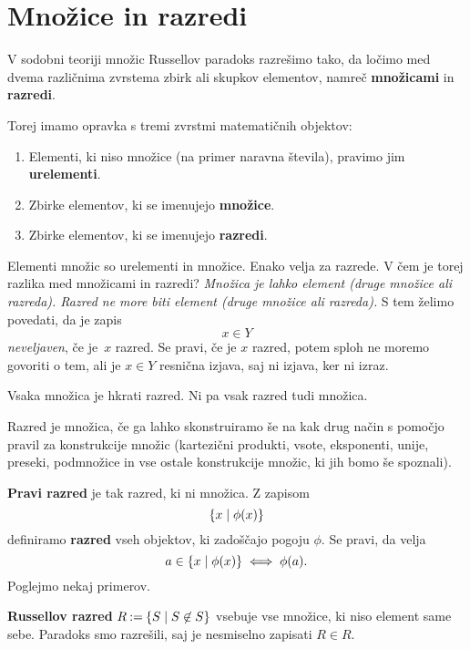 \section{Množice in razredi}

V sodobni teoriji množic Russellov paradoks razrešimo tako, da ločimo med dvema
različnima zvrstema zbirk ali skupkov elementov, namreč \textbf{množicami} in \textbf{razredi}.

Torej imamo opravka s tremi zvrstmi matematičnih objektov:
%
\begin{enumerate}
\item Elementi, ki niso množice (na primer naravna števila), pravimo jim \textbf{urelementi}.
\item Zbirke elementov, ki se imenujejo \textbf{množice}.
\item Zbirke elementov, ki se imenujejo \textbf{razredi}.
\end{enumerate}
%
Elementi množic so urelementi in množice. Enako velja za razrede.
%
V čem je torej razlika med množicami in razredi?
%
\emph{Množica je lahko element (druge množice ali razreda).
Razred ne more biti element (druge množice ali razreda).}
%
S tem želimo povedati, da je zapis
%
\begin{equation*}
    x \in Y
  \end{equation*}
%
\emph{neveljaven}, če je~$x$ razred. Se pravi, če je $x$ razred, potem sploh ne moremo govoriti o tem, ali je $x \in Y$ resnična izjava, saj ni izjava, ker ni izraz.

Vsaka množica je hkrati razred. Ni pa vsak razred tudi množica.

Razred je množica, če ga lahko skonstruiramo še na kak drug način s pomočjo
pravil za konstrukcije množic (kartezični produkti, vsote, eksponenti, unije,
preseki, podmnožice in vse ostale konstrukcije množic, ki jih bomo še spoznali).

\textbf{Pravi razred} je tak razred, ki ni množica.
%
Z zapisom
%
\begin{equation*}
  \left\{ x \; \middle| \; \phi(x) \right\}
\end{equation*}
%
definiramo \textbf{razred} vseh objektov, ki zadoščajo pogoju $\phi$. Se pravi, da velja
%
\begin{equation*}
    a \in \left\{ x \; \middle| \; \phi(x) \right\} \iff \phi(a).
\end{equation*}
%
Poglejmo nekaj primerov.

\begin{primer}
  \textbf{Russellov razred} $R \mathbin{{:}{=}} \left\{ S \; \middle| \; S \not\in S \right\}$ vsebuje vse množice, ki niso element same sebe. Paradoks smo razrešili, saj je nesmiselno zapisati $R \in R$.
\end{primer}



